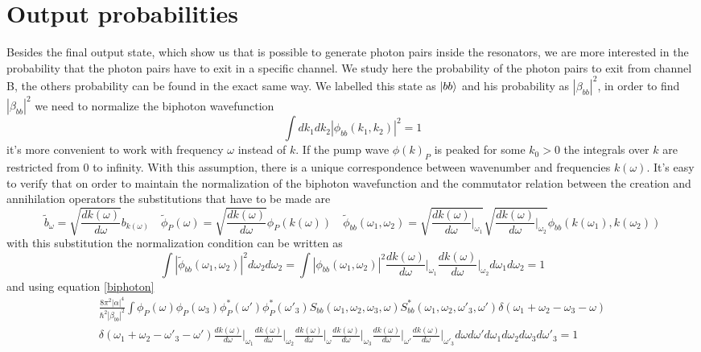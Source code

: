 \section{Output probabilities}
Besides the final output state, which show us that is possible to generate photon pairs inside the resonators, we are more interested in the probability that the photon pairs have to exit in a specific channel. We study here the probability of the photon pairs to exit from channel B, the others probability can be found in the exact same way. We labelled this state as $\ket{bb}$ and his probability as $|\beta_{bb}|^2$, in order to find $|\beta_{bb}|^2$ we need to normalize the biphoton wavefunction
\begin{equation}\int dk_1 dk_2 |\phi_{bb}(k_1,k_2)|^2 = 1 \end{equation}
it's more convenient to work with frequency $\omega$ instead of $k$. If the pump wave $\phi(k)_P$ is peaked for some $k_0>0$ the integrals over $k$ are restricted from 0 to infinity. With this assumption, there is a unique correspondence between wavenumber and frequencies $k(\omega)$. It's easy to verify that on order to maintain the normalization of the biphoton wavefunction and the commutator relation between the creation and annihilation operators the substitutions that have to be made are
\begin{equation}\widetilde{b}_\omega = \sqrt{\frac{dk(\omega)}{d\omega}}b_{k(\omega)} \quad \widetilde{\phi}_P(\omega) = \sqrt{\frac{dk(\omega)}{d\omega}}\phi_P(k(\omega)) \quad \widetilde{\phi}_{bb}(\omega_1,\omega_2) = \sqrt{\frac{dk(\omega)}{d\omega}\Bigg|_{\omega_1}}\sqrt{\frac{dk(\omega)}{d\omega}\Bigg|_{\omega_2}}\phi_{bb}(k(\omega_1),k(\omega_2)) \end{equation}
with this substitution the normalization condition can be written as
\begin{equation}\int |\widetilde{\phi}_{bb}(\omega_1,\omega_2)|^2d\omega_2d\omega_2 = \int |\phi_{bb}(\omega_1,\omega_2)|^2\frac{dk(\omega)}{d\omega}\Bigg|_{\omega_1}\frac{dk(\omega)}{d\omega}\Bigg|_{\omega_2} d\omega_1d\omega_2 = 1\end{equation}
and using equation \eqref{biphoton}
\begin{multline}\frac{8\pi^2|\alpha|^4}{\hbar^2|\beta_{bb}|^2}\int \phi_P(\omega)\phi_P(\omega_3)\phi_P^*(\omega')\phi^*_P(\omega'_{3})S_{bb}(\omega_1,\omega_2,\omega_3,\omega)S^*_{bb}(\omega_1,\omega_2,\omega'_3,\omega')\delta(\omega_1+\omega_2-\omega_{3}-\omega)\\
\delta(\omega_1+\omega_2-\omega'_{3}-\omega')\frac{dk(\omega)}{d\omega}\Bigg|_{\omega_1}\frac{dk(\omega)}{d\omega}\Bigg|_{\omega_2}\frac{dk(\omega)}{d\omega}\Bigg|_{\omega}\frac{dk(\omega)}{d\omega}\Bigg|_{\omega_3}\frac{dk(\omega)}{d\omega}\Bigg|_{\omega'}\frac{dk(\omega)}{d\omega}\Bigg|_{\omega'_3} d\omega d\omega'  d\omega_1d\omega_2d\omega_3 d\omega'_3= 1 \end{multline}
